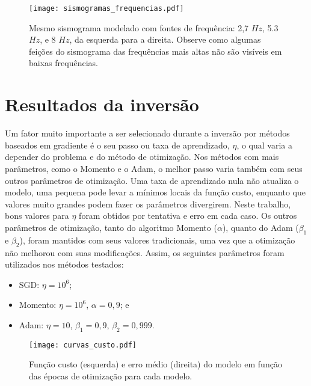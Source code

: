     \begin{figure}
      \begin{center}
        \texttt{[image: sismogramas\_frequencias.pdf]}
      \end{center}
      \caption{Mesmo sismograma modelado com fontes de frequência: 2,7 $Hz$, 5.3 $Hz$, e 8 $Hz$, da esquerda para a direita. Observe como algumas feições do sismograma das frequências mais altas não são visíveis em baixas frequências.}
      \label{f:sismogramas_frequencias}
    \end{figure}


  \section{Resultados da inversão}

    Um fator muito importante a ser selecionado durante a inversão por métodos baseados em gradiente é o seu passo ou taxa de aprendizado, $\eta$, o qual varia a depender do problema e do método de otimização. Nos métodos com mais parâmetros, como o Momento e o Adam, o melhor passo varia também com seus outros parâmetros de otimização. Uma taxa de aprendizado nula não atualiza o modelo, uma pequena pode levar a mínimos locais da função custo, enquanto que valores muito grandes podem fazer os parâmetros divergirem. Neste trabalho, bons valores para $\eta$ foram obtidos por tentativa e erro em cada caso. Os outros parâmetros de otimização, tanto do algoritmo Momento ($\alpha$), quanto do Adam ($\beta_1$ e $\beta_2$), foram mantidos com seus valores tradicionais, uma vez que a otimização não melhorou com suas modificações. Assim, os seguintes parâmetros foram utilizados nos métodos testados:

    \begin{itemize}
      \item SGD: $\eta=10^6$;
      \item Momento: $\eta=10^6$, $\alpha=0,9$; e
      \item Adam: $\eta=10$, $\beta_1=0,9$, $\beta_2=0,999$.
    \end{itemize}

    \begin{figure}
      \begin{center}
        \texttt{[image: curvas\_custo.pdf]}
      \end{center}
      \caption{Função custo (esquerda) e erro médio (direita) do modelo em função das épocas de otimização para cada modelo.}
      \label{f:curvas_custo}
    \end{figure}

